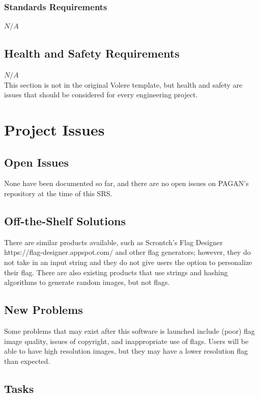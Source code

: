 \documentclass[12pt, titlepage]{article}
\begin{document}
\subsubsection{Standards Requirements}
$N/A$
\subsection{Health and Safety Requirements}
$N/A$\\
This section is not in the original Volere template, but health and safety are
issues that should be considered for every engineering project.

\section{Project Issues}

\subsection{Open Issues}

None have been documented so far, and there are no open issues on PAGAN's repository at the time of this SRS. 

\subsection{Off-the-Shelf Solutions}

There are similar products available, such as Scrontch's Flag Designer https://flag-designer.appspot.com/ and other flag generators; however, they do not take in an input string and they do not give users the option to personalize their flag. There are also existing products that use strings and hashing algorithms to generate random images, but not flags.

\subsection{New Problems}

Some problems that may exist after this software is launched include (poor) flag image quality, issues of copyright, and inappropriate use of flags. Users will be able to have high resolution images, but they may have a lower resolution flag than expected.

\subsection{Tasks}
\end{document}
